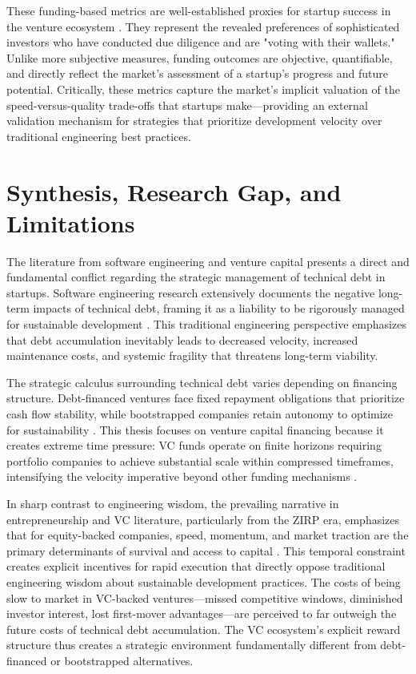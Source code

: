 These funding-based metrics are well-established proxies for startup success in the venture ecosystem \citep{gompers2001venture}. They represent the revealed preferences of sophisticated investors who have conducted due diligence and are "voting with their wallets." Unlike more subjective measures, funding outcomes are objective, quantifiable, and directly reflect the market's assessment of a startup's progress and future potential. Critically, these metrics capture the market's implicit valuation of the speed-versus-quality trade-offs that startups make—providing an external validation mechanism for strategies that prioritize development velocity over traditional engineering best practices.

\section{Synthesis, Research Gap, and Limitations}\label{sec:lit_gap}

The literature from software engineering and venture capital presents a direct and fundamental conflict regarding the strategic management of technical debt in startups. Software engineering research extensively documents the negative long-term impacts of technical debt, framing it as a liability to be rigorously managed for sustainable development \citep{colazo2010collaboration, arcelli2012investigating}. This traditional engineering perspective emphasizes that debt accumulation inevitably leads to decreased velocity, increased maintenance costs, and systemic fragility that threatens long-term viability.

The strategic calculus surrounding technical debt varies depending on financing structure. Debt-financed ventures face fixed repayment obligations that prioritize cash flow stability, while bootstrapped companies retain autonomy to optimize for sustainability \citep{levesque2000effects}. This thesis focuses on venture capital financing because it creates extreme time pressure: \ac{VC} funds operate on finite horizons requiring portfolio companies to achieve substantial scale within compressed timeframes, intensifying the velocity imperative beyond other funding mechanisms \citep{gompers2001venture}.

In sharp contrast to engineering wisdom, the prevailing narrative in entrepreneurship and \ac{VC} literature, particularly from the \ac{ZIRP} era, emphasizes that for equity-backed companies, speed, momentum, and market traction are the primary determinants of survival and access to capital \citep{kuratko2020blitzscaling}. This temporal constraint creates explicit incentives for rapid execution that directly oppose traditional engineering wisdom about sustainable development practices. The costs of being slow to market in VC-backed ventures—missed competitive windows, diminished investor interest, lost first-mover advantages—are perceived to far outweigh the future costs of technical debt accumulation. The \ac{VC} ecosystem's explicit reward structure thus creates a strategic environment fundamentally different from debt-financed or bootstrapped alternatives.

